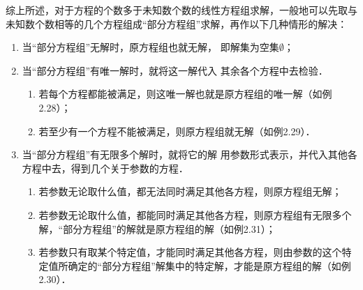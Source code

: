 综上所述，对于方程的个数多于未知数个数的线性方程组求解，一般地可以先取与未知数个数相等的几个方程组成“部分方程组”求解，再作以下几种情形的解决：
\begin{enumerate}
    \item 当“部分方程组”无解时，原方程组也就无解，
即解集为空集$\emptyset$；
\item 当“部分方程组”有唯一解时，就将这一解代入
其余各个方程中去检验． 
\begin{enumerate}
    \item 若每个方程都能被满足，则这唯一解也就是原方程组的唯一解（如例2.28）；
    \item 若至少有一个方程不能被满足，则原方程组就无解（如例2.29）．
\end{enumerate}

\item 当“部分方程组”有无限多个解时，就将它的解
用参数形式表示，并代入其他各方程中去，得到几个关于参数的方程．
\begin{enumerate}
    \item 若参数无论取什么值，都无法同时满足其他各方程，则原方程组无解；
    \item 若参数无论取什么值，都能同时满足其他各方程，则原方程组有无限多个解，“部分方程组”的解就是原方程组的解（如例2.31）；
    \item 若参数只有取某个特定值，才能同时满足其他各方程，则由参数的这个特定值所确定的“部分方程组”解集中的特定解，才能是原方程组的解（如例2.30）．
\end{enumerate}

\end{enumerate}

